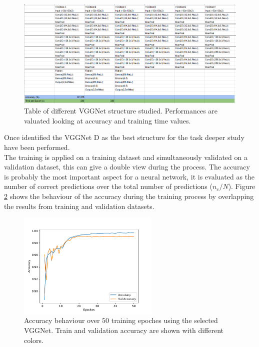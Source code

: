 \begin{figure}
	\centering
	\includegraphics[width=1.\textwidth]{IMG/Cap6/VGGNet-Tab.png}
	\caption{Table of different VGGNet structure studied. Performances are valuated looking at accuracy and training time values.}
	\label{fig:VGGNet-tested}
\end{figure}

Once identified the VGGNet D as the best structure for the task deeper study have been performed.\\
The training is applied on a training dataset and simultaneously validated on a validation dataset, this can give a double view during the process.
The accuracy is probably the most important aspect for a neural network, it is evaluated as the number of correct predictions over the total number of predictions ($n_c/N$). Figure \ref{fig:VGGNet-acc} shows the behaviour of the accuracy during the training process by overlapping the results from training and validation datasets.\\

\begin{figure}
	\centering
	\includegraphics[width=0.6\textwidth]{IMG/Cap6/VGGNet-D_Accuracy.pdf}
	\caption{Accuracy behaviour over $50$ training epoches using the selected VGGNet. Train and validation accuracy are shown with different colors.}
	\label{fig:VGGNet-acc}
\end{figure}

